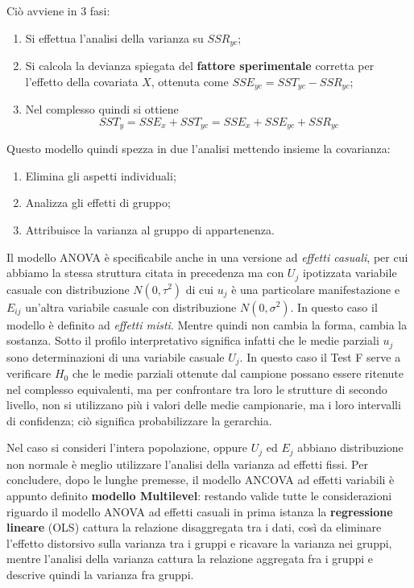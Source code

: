 \documentclass[a4page, 11pt]{article} %
\begin{document}
Ciò avviene in 3 fasi:
\begin{enumerate}
\item Si effettua l'analisi della varianza su $SSR_{yc}$;
\item Si calcola la devianza spiegata del \textbf{fattore sperimentale} corretta per l'effetto della covariata $X$, ottenuta come $SSE_{yc} = SST_{yc}-SSR_{yc}$;
\item Nel complesso quindi si ottiene
\begin{equation*}
SST_y = SSE_x + SST_{yc} = SSE_x + SSE_{yc} + SSR_{yc}
\end{equation*}
\end{enumerate}
Questo modello quindi spezza in due l’analisi mettendo insieme la covarianza:
\begin{enumerate}
\item Elimina gli aspetti individuali; 
\item Analizza gli effetti di gruppo;
\item Attribuisce la varianza al gruppo di appartenenza.
\end{enumerate}
Il modello ANOVA è specificabile anche in una versione ad \textit{effetti casuali}, per cui abbiamo la stessa struttura citata in precedenza ma con $U_j$ ipotizzata variabile casuale con distribuzione $N(0, \tau^2)$ di cui $u_j$ è una particolare manifestazione e $E_{ij}$ un'altra variabile casuale con distribuzione $N(0,\sigma^2)$. In questo caso il modello è definito ad \textit{effetti misti}. 
Mentre quindi non cambia la forma, cambia la sostanza. 
Sotto il profilo interpretativo significa infatti che le medie parziali $u_j$ sono determinazioni di una variabile casuale $U_j$. In questo caso il Test F serve a verificare $H_0$ che le medie parziali ottenute dal campione possano essere ritenute nel complesso equivalenti, ma per confrontare tra loro le strutture di secondo livello, non si utilizzano più i valori delle medie campionarie, ma i loro intervalli di confidenza; ciò significa probabilizzare la gerarchia.

Nel caso si consideri l'intera popolazione, oppure $U_j$ ed $E_j$ abbiano distribuzione non normale è meglio utilizzare l'analisi della varianza ad effetti fissi.
\newline
\newline
Per concludere, dopo le lunghe premesse, il modello ANCOVA ad effetti variabili è appunto definito \textbf{modello Multilevel}: restando valide tutte le considerazioni riguardo il modello ANOVA ad effetti casuali in prima istanza la \textbf{regressione lineare} (OLS) cattura la relazione disaggregata tra i dati, così da eliminare l'effetto distorsivo sulla varianza tra i gruppi e ricavare la varianza nei gruppi, mentre l'analisi della varianza cattura la relazione aggregata fra i gruppi e descrive quindi la varianza fra  gruppi.
\end{document}
